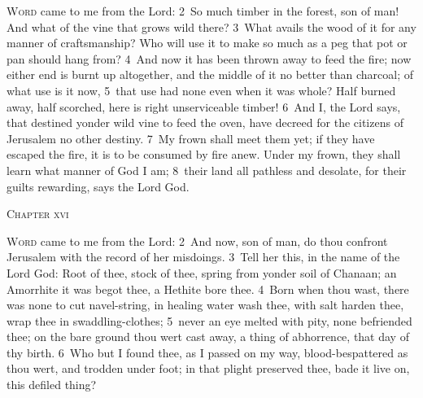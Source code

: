 \documentclass[10pt]{book} %
\begin{document}
\lettrine[lines=2]{W}{ord} came to me from the Lord: \textcolor{benred8}{2}~So much timber in the forest, son of man! And what of the vine that grows wild there? \textcolor{benred8}{3}~What avails the wood of it for any manner of craftsmanship? Who will use it to make so much as a peg that pot or pan should hang from? \textcolor{benred8}{4}~And now it has been thrown away to feed the fire; now either end is burnt up altogether, and the middle of it no better than charcoal; of what use is it now, \textcolor{benred8}{5}~that use had none even when it was whole? Half burned away, half scorched, here is right unserviceable timber! \textcolor{benred8}{6}~And I, the Lord says, that destined yonder wild vine to feed the oven, have decreed for the citizens of Jerusalem no other destiny. \textcolor{benred8}{7}~My frown shall meet them yet; if they have escaped the fire, it is to be consumed by fire anew. Under my frown, they shall learn what manner of God I am; \textcolor{benred8}{8}~their land all pathless and desolate, for their guilt\textquotesingle s rewarding, says the Lord God.
\begin{large}\begin{center}\textsc{Chapter xvi}\end{center}\end{large}
\lettrine[lines=2]{W}{ord} came to me from the Lord: \textcolor{benred8}{2}~And now, son of man, do thou confront Jerusalem with the record of her misdoings. \textcolor{benred8}{3}~Tell her this, in the name of the Lord God: Root of thee, stock of thee, spring from yonder soil of Chanaan; an Amorrhite it was begot thee, a Hethite bore thee. \textcolor{benred8}{4}~Born when thou wast, there was none to cut navel-string, in healing water wash thee, with salt harden thee, wrap thee in swaddling-clothes; \textcolor{benred8}{5}~never an eye melted with pity, none befriended thee; on the bare ground thou wert cast away, a thing of abhorrence, that day of thy birth. \textcolor{benred8}{6}~Who but I found thee, as I passed on my way, blood-bespattered as thou wert, and trodden under foot; in that plight preserved thee, bade it live on, this defiled thing?
\end{document}
